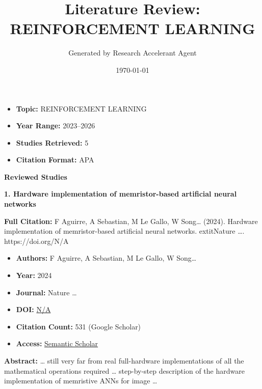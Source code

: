 \documentclass[11pt,a4paper]{article}
\title{\textbf{Literature Review: REINFORCEMENT LEARNING }}
\author{Generated by Research Accelerant Agent}
\date{\today}
\begin{document}
\maketitle



\begin{resultbox}
\begin{itemize}[leftmargin=*]
    \item \textbf{Topic:} REINFORCEMENT LEARNING 
    \item \textbf{Year Range:} 2023--2026
    \item \textbf{Studies Retrieved:} 5
    \item \textbf{Citation Format:} APA
\end{itemize}
\end{resultbox}

\vspace{1em}

\textbf{\large Reviewed Studies}\par\vspace{0.5em}


\textbf{1. Hardware implementation of memristor-based artificial neural networks}

\textbf{Full Citation:} F Aguirre, A Sebastian, M Le Gallo, W Song… (2024). Hardware implementation of memristor-based artificial neural networks. 	extit{Nature …}. https://doi.org/N/A

\begin{resultbox}
\begin{itemize}[leftmargin=*]
    \item \textbf{Authors:} F Aguirre, A Sebastian, M Le Gallo, W Song…
    \item \textbf{Year:} 2024
    \item \textbf{Journal:} Nature …
    
    
    
    \item \textbf{DOI:} \href{https://doi.org/}{N/A}
    \item \textbf{Citation Count:} 531 (Google Scholar)
    \item \textbf{Access:} \href{https://www.nature.com/articles/s41467-024-45670-9}{Semantic Scholar}
\end{itemize}
\end{resultbox}

\textbf{Abstract:} … still very far from real full-hardware implementations of all the mathematical operations required … step-by-step description of the hardware implementation of memristive ANNs for image …\par\vspace{0.5em}
\end{document}
